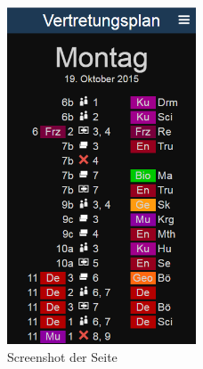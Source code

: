 \begin{figure}[ht]
	\centering
  \includegraphics[height=10cm]{mobile.png}
	\caption{Screenshot der Seite}
	\label{fig1}
\end{figure}
